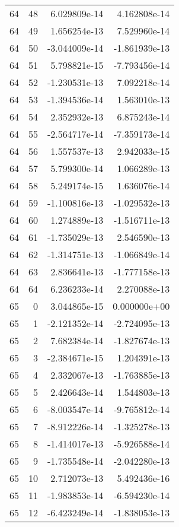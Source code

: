 \begin{tabular}{rrrr}
  64 &   48 &  6.029809e-14 &  4.162808e-14 \\
  64 &   49 &  1.656254e-13 &  7.529960e-14 \\
  64 &   50 & -3.044009e-14 & -1.861939e-13 \\
  64 &   51 &  5.798821e-15 & -7.793456e-14 \\
  64 &   52 & -1.230531e-13 &  7.092218e-14 \\
  64 &   53 & -1.394536e-14 &  1.563010e-13 \\
  64 &   54 &  2.352932e-13 &  6.875243e-14 \\
  64 &   55 & -2.564717e-14 & -7.359173e-14 \\
  64 &   56 &  1.557537e-13 &  2.942033e-15 \\
  64 &   57 &  5.799300e-14 &  1.066289e-13 \\
  64 &   58 &  5.249174e-15 &  1.636076e-14 \\
  64 &   59 & -1.100816e-13 & -1.029532e-13 \\
  64 &   60 &  1.274889e-13 & -1.516711e-13 \\
  64 &   61 & -1.735029e-13 &  2.546590e-13 \\
  64 &   62 & -1.314751e-13 & -1.066849e-14 \\
  64 &   63 &  2.836641e-13 & -1.777158e-13 \\
  64 &   64 &  6.236233e-14 &  2.270088e-13 \\
  65 &    0 &  3.044865e-15 &  0.000000e+00 \\
  65 &    1 & -2.121352e-14 & -2.724095e-13 \\
  65 &    2 &  7.682384e-14 & -1.827674e-13 \\
  65 &    3 & -2.384671e-15 &  1.204391e-13 \\
  65 &    4 &  2.332067e-13 & -1.763885e-13 \\
  65 &    5 &  2.426643e-14 &  1.544803e-13 \\
  65 &    6 & -8.003547e-14 & -9.765812e-14 \\
  65 &    7 & -8.912226e-14 & -1.325278e-13 \\
  65 &    8 & -1.414017e-13 & -5.926588e-14 \\
  65 &    9 & -1.735548e-14 & -2.042280e-13 \\
  65 &   10 &  2.712073e-13 &  5.492436e-16 \\
  65 &   11 & -1.983853e-14 & -6.594230e-14 \\
  65 &   12 & -6.423249e-14 & -1.838053e-13 \\

\end{tabular}
